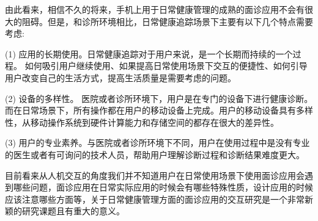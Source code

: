 由此看来，相信不久的将来，手机上用于日常健康管理的成熟的面诊应用不会有很大的阻碍。但是，和诊所环境相比，日常健康追踪场景下主要有以下几个特点需要考虑: 

(1) 应用的长期使用。日常健康追踪对于用户来说，是一个长期而持续的一个过程。 如何吸引用户继续使用、如果提高日常使用场景下交互的便捷性、如何引导用户改变自己的生活方式，提高生活质量是需要考虑的问题。

(2) 设备的多样性。 医院或者诊所环境下，用户是在专门的设备下进行健康诊断。而在日常场景下，所有操作都在用户的移动设备上完成。用户的移动设备具有多样性，从移动操作系统到硬件计算能力和存储空间的都存在很大的差异性。

(3) 用户的专业素养。与医院或者诊所环境下不同，用户在使用过程中是没有专业的医生或者有可询问的技术人员，帮助用户理解诊断过程和诊断结果难度更大。

目前看来从人机交互的角度我们并不知道用户在日常使用场景下使用面诊应用会遇到哪些问题，面诊应用在日常实际应用的时候会有哪些特殊性质，设计应用的时候应该注意哪些方面等，关于日常健康管理方面的面诊应用的交互研究是一个非常新颖的研究课题且有重大的意义。








